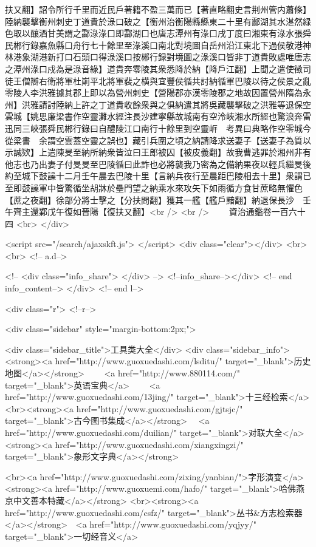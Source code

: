 扶又翻】詔令所行千里而近民戶著籍不盈三萬而已【著直略翻史言荆州管内蕭條】陸納襲擊衡州刺史丁道貴於淥口破之【衡州治衡陽縣縣東二十里有酃湖其水湛然緑色取以釀酒甘美謂之酃淥淥口即酃湖口也唐志潭州有淥口戌丁度曰湘東有淥水張舜民郴行錄嘉魚縣口舟行七十餘里至淥溪口南北對境圖自岳州沿江東北下過侯敬港神林港象湖港新打口石頭口得淥溪口按郴行録對境圖之淥溪口皆非丁道貴敗處唯唐志之潭州淥口戍為是淥音綠】道貴奔零陵其衆悉降於納【降戶江翻】上聞之遣使徵司徒王僧辯右衛將軍杜崱平北將軍裴之横與宜豐侯循共討納循軍巴陵以待之侯景之亂零陵人李洪雅據其郡上即以為營州刺史【營陽郡亦漢零陵郡之地故因置營州隋為永州】洪雅請討陸納上許之丁道貴收餘衆與之俱納遣其將吳藏襲擊破之洪雅等退保空雲城【姚思廉梁書作空靈灘水經注長沙建寧縣故城南有空泠峽湘水所經也驚浪奔雷迅同三峽張舜民郴行錄曰自醴陵江口南行十餘里到空靈㟁　考異曰典略作空零城今從梁書　余謂空雲蓋空靈之誤也】藏引兵圍之頃之納請降求送妻子【送妻子為質以示誠欵】上遣陳旻至納所納衆皆泣曰王郎被囚【被皮義翻】故我曹逃罪於湘州非有他志也乃出妻子付旻旻至巴陵循曰此詐也必將襲我乃密為之備納果夜以輕兵繼旻後約至城下鼓譟十二月壬午晨去巴陵十里【言納兵夜行至晨距巴陵相去十里】衆謂已至即鼓譟軍中皆驚循坐胡牀於壘門望之納乘水來攻矢下如雨循方食甘蔗略無懼色【蔗之夜翻】徐部分將士擊之【分扶問翻】獲其一艦【艦戶黯翻】納退保長沙　壬午齊主還鄴戊午復如晉陽【復扶又翻】<br />
<br />
　　資治通鑑卷一百六十四  <br>
   </div> 

<script src="/search/ajaxskft.js"> </script>
 <div class="clear"></div>
<br>
<br>
 <!-- a.d-->

 <!--
<div class="info_share">
</div> 
-->
 <!--info_share--></div>   <!-- end info_content-->
  </div> <!-- end l-->

<div class="r">   <!--r-->



<div class="sidebar"  style="margin-bottom:2px;">

 
<div class="sidebar_title">工具类大全</div>
<div class="sidebar_info">
<strong><a href="http://www.guoxuedashi.com/lsditu/" target="_blank">历史地图</a></strong>　　
<a href="http://www.880114.com/" target="_blank">英语宝典</a>　　
<a href="http://www.guoxuedashi.com/13jing/" target="_blank">十三经检索</a>　
<br><strong><a href="http://www.guoxuedashi.com/gjtsjc/" target="_blank">古今图书集成</a></strong>　
<a href="http://www.guoxuedashi.com/duilian/" target="_blank">对联大全</a>　<strong><a href="http://www.guoxuedashi.com/xiangxingzi/" target="_blank">象形文字典</a></strong>　

<br><a href="http://www.guoxuedashi.com/zixing/yanbian/">字形演变</a>　　<strong><a href="http://www.guoxuemi.com/hafo/" target="_blank">哈佛燕京中文善本特藏</a></strong>
<br><strong><a href="http://www.guoxuedashi.com/csfz/" target="_blank">丛书&方志检索器</a></strong>　<a href="http://www.guoxuedashi.com/yqjyy/" target="_blank">一切经音义</a>　　

